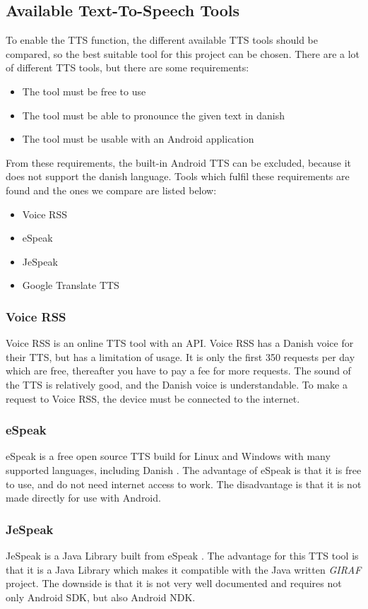 \subsection{Available Text-To-Speech Tools}
\label{sec:ttstool}
To enable the TTS function, the different available TTS tools should be compared, so the best suitable tool for this project can be chosen.
There are a lot of different TTS tools, but there are some requirements:
\begin{itemize}
	\item The tool must be free to use
	\item The tool must be able to pronounce the given text in danish
	\item The tool must be usable with an Android application
\end{itemize}
From these requirements, the built-in Android TTS can be excluded, because it does not support the danish language.
Tools which fulfil these requirements are found and the ones we compare are listed below:
\begin{itemize}
	\item Voice RSS
	\item eSpeak
	\item JeSpeak
	\item Google Translate TTS
\end{itemize}

\subsubsection{Voice RSS}
Voice RSS \citep{voicerss} is an online TTS tool with an API. Voice RSS has a Danish voice for their TTS, but has a limitation of usage. It is only the first 350 requests per day which are free, thereafter you have to pay a fee for more requests. The sound of the TTS is relatively good, and the Danish voice is understandable. To make a request to Voice RSS, the device must be connected to the internet.

\subsubsection{eSpeak}
eSpeak is a free open source TTS build for Linux and Windows with many supported languages, including Danish \citep{espeak}. The advantage of eSpeak is that it is free to use, and do not need internet access to work. The disadvantage is that it is not made directly for use with Android. 

\subsubsection{JeSpeak}
JeSpeak is a Java Library built from eSpeak \citep{jespeak}. The advantage for this TTS tool is that it is a Java Library which makes it compatible with the Java written \textit{GIRAF} project. The downside is that it is not very well documented and requires not only Android SDK, but also Android NDK.

